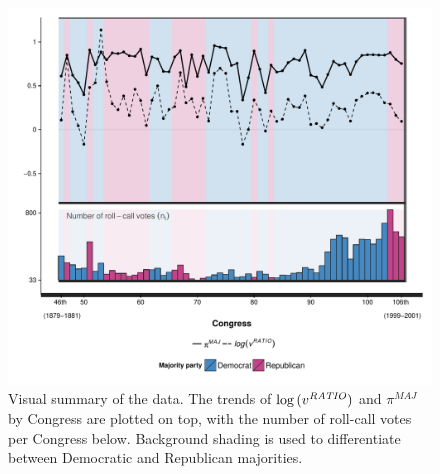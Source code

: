 \begin{figure}[p]
\centering
	\includegraphics[scale=0.75]{sections/figs/vis_summary}
\caption{Visual summary of the data. The trends of $\log{(v^{\it RATIO} )}$ and $\pi^{MAJ}$ by Congress are plotted on top, with the number of roll-call votes per Congress below. Background shading is used to differentiate between Democratic and Republican majorities.}
\label{fig:data_summary}
\end{figure}
%

%

